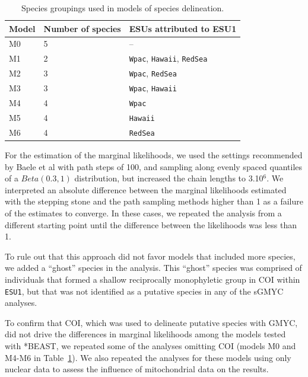 \documentclass[12pt,letterpaper]{article}\usepackage[]{graphicx}\usepackage[]{color}
\begin{document}
\begin{table}
  \centering
  \caption{Species groupings used in models of species delineation.}
  \begin{tabular}{ l l l }
    \hline
    Model   & Number of species & ESUs attributed to ESU1 \\
    \hline
    M0      &     5             &  --                     \\
    M1      &     2             &  \texttt{Wpac}, \texttt{Hawaii}, \texttt{RedSea}   \\
    M2      &     3             &  \texttt{Wpac}, \texttt{RedSea}           \\
    M3      &     3             &  \texttt{Wpac}, \texttt{Hawaii}           \\
    M4      &     4             &  \texttt{Wpac}                   \\
    M5      &     4             &  \texttt{Hawaii}                 \\
    M6      &     4             &  \texttt{RedSea}                 \\
    \hline
  \end{tabular}
  \label{tab:delineationModels}
\end{table}

For the estimation of the marginal likelihoods, we used the settings recommended
by Baele et al \citep{Baele2012} with path steps of 100, and sampling along
evenly spaced quantiles of a $Beta(0.3, 1)$ distribution, but increased the
chain lengths to 3.10$^{6}$. We interpreted an absolute difference between the
marginal likelihoods estimated with the stepping stone and the path sampling
methods higher than 1 as a failure of the estimates to converge. In these cases,
we repeated the analysis from a different starting point until the difference
between the likelihoods was less than 1.

To rule out that this approach did not favor models that included more species,
we added a ``ghost'' species in the analysis. This ``ghost'' species was
comprised of individuals that formed a shallow reciprocally monophyletic group
in COI within \texttt{ESU1}, but that was not identified as a putative species
in any of the sGMYC analyses.

To confirm that COI, which was used to delineate putative species with GMYC, did
not drive the differences in marginal likelihoods among the models tested with
*BEAST, we repeated some of the analyses omitting COI (models M0 and M4-M6 in
Table~\ref{tab:delineationModels}). We also repeated the analyses for these
models using only nuclear data to assess the influence of mitochondrial data on
the results.
\end{document}
